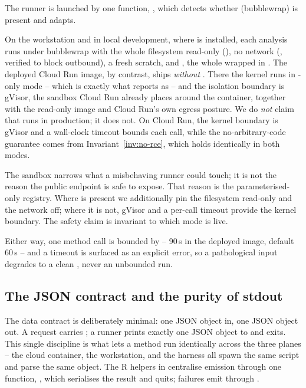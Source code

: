 The runner is launched by one function, , which detects whether
 (bubblewrap) is present and adapts.

On the workstation and in local development, where  is installed, each
analysis runs under bubblewrap with the whole filesystem read-only
(), no network (, verified to block
outbound), a fresh  scratch, and , the whole
wrapped in . The deployed Cloud Run image, by contrast, ships
\emph{without} . There the kernel runs in -only mode --
which is exactly what  reports as  -- and the
isolation boundary is gVisor, the sandbox Cloud Run already places around the
container, together with the read-only image and Cloud Run's own egress posture. We
do \emph{not} claim that  runs in production; it does not. On Cloud Run,
the kernel boundary is gVisor and a wall-clock timeout bounds each call, while the
no-arbitrary-code guarantee comes from Invariant~\ref{inv:no-rce}, which holds
identically in both modes.

\begin{principle}
\label{prin:depth}
The sandbox narrows what a misbehaving runner could touch; it is not the reason the
public endpoint is safe to expose. That reason is the parameterised-only registry.
Where  is present we additionally pin the filesystem read-only and the
network off; where it is not, gVisor and a per-call timeout provide the kernel
boundary. The safety claim is invariant to which mode is live.
\end{principle}

Either way, one method call is bounded by  -- 90\,s in the
deployed image, default 60\,s -- and a timeout is surfaced as an explicit error, so
a pathological input degrades to a clean , never an unbounded
run.

\subsection{The JSON contract and the purity of stdout}
\label{sec:json-contract}

The data contract is deliberately minimal: one JSON object in, one JSON object out.
A request carries ; a runner prints exactly one JSON object
to  and exits. This single discipline is what lets a method run
identically across the three planes -- the cloud container, the workstation, and the
harness all spawn the same script and parse the same object. The R helpers in
 centralise emission through one function, , which
serialises the result and quits; failures emit  through
.

